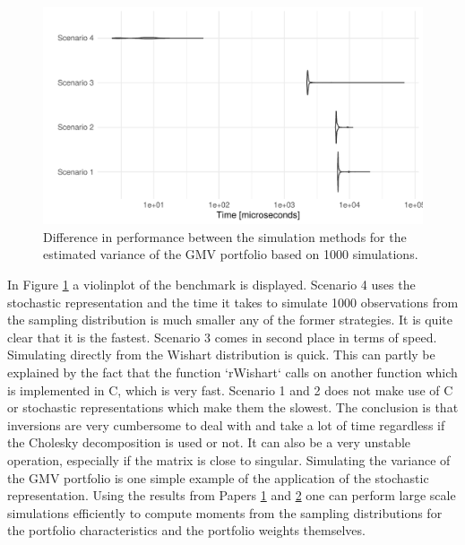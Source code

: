 \documentclass[12pt, oneside]{book}\usepackage{knitr}
\begin{document}
\begin{knitrout}\small
{}\color{fgcolor}\begin{figure}

{\centering \includegraphics[width=\maxwidth]{figure/microbenchmark_output-1} 

}

\caption[Difference in performance between the simulation methods for the estimated variance of the GMV portfolio based on 1000 simulations]{Difference in performance between the simulation methods for the estimated variance of the GMV portfolio based on 1000 simulations.}\label{fig:microbenchmark_output}
\end{figure}

\end{knitrout}

In Figure \ref{fig:microbenchmark_output} a violinplot of the benchmark is displayed.
Scenario 4 uses the stochastic representation and the time it takes to simulate 1000 observations from the sampling distribution is much smaller any of the former strategies.
It is quite clear that it is the fastest.
Scenario 3 comes in second place in terms of speed.
Simulating directly from the Wishart distribution is quick.
This can partly be explained by the fact that the function `rWishart` calls on another function which is implemented in C, which is very fast.
Scenario 1 and 2 does not make use of C or stochastic representations which make them the slowest.
The conclusion is that inversions are very cumbersome to deal with and take a lot of time regardless if the Cholesky decomposition is used or not.
It can also be a very unstable operation, especially if the matrix is close to singular.
Simulating the variance of the GMV portfolio is one simple example of the application of the stochastic representation.
Using the results from Papers \hyperref[sec:paper1]{1} and \hyperref[sec:paper2]{2} one can perform large scale simulations efficiently to compute moments from the sampling distributions for the portfolio characteristics and the portfolio weights themselves.
\end{document}
